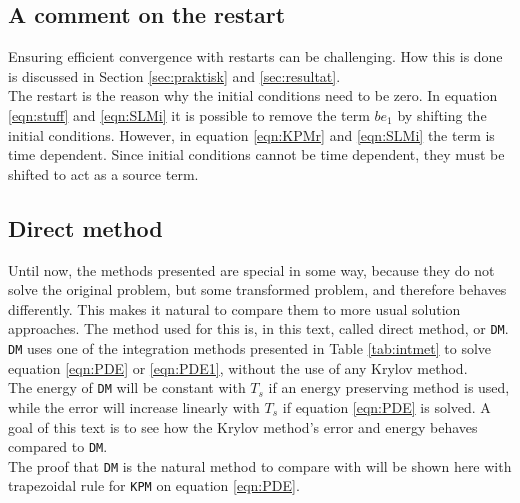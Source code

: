 \subsection{A comment on the restart} %

\noindent Ensuring efficient convergence with restarts can be challenging. How this is done is discussed in Section \ref{sec:praktisk} and \ref{sec:resultat}. \\

\noindent The restart is the reason why the initial conditions need to be zero. In equation \eqref{eqn:stuff} and \eqref{eqn:SLMi} it is possible to remove the term $be_1$ by shifting the initial conditions. However, in equation \eqref{eqn:KPMr} and \eqref{eqn:SLMi} the term is time dependent. Since initial conditions cannot be time dependent, they must be shifted to act as a source term.

\subsection{Direct method} \label{sec:DM}
Until now, the methods presented are special in some way, because they do not solve the original problem, but some transformed problem, and therefore behaves differently. This makes it natural to compare them to more usual solution approaches. The method used for this is, in this text, called direct method, or \texttt{DM}. \texttt{DM} uses one of the integration methods presented in Table \ref{tab:intmet} to solve equation \eqref{eqn:PDE} or \eqref{eqn:PDE1}, without the use of any Krylov method.\\


\noindent The energy of \texttt{DM} will be constant with $T_s$ if an energy preserving method is used, while the error will increase linearly with $T_s$ \cite{linearerrorgrowth} if equation \eqref{eqn:PDE} is solved. A goal of this text is to see how the Krylov method's error and energy behaves compared to \texttt{DM}. \\

\noindent The proof that \texttt{DM} is the natural method to compare with will be shown here with trapezoidal rule for \texttt{KPM} on equation \eqref{eqn:PDE}.\\

